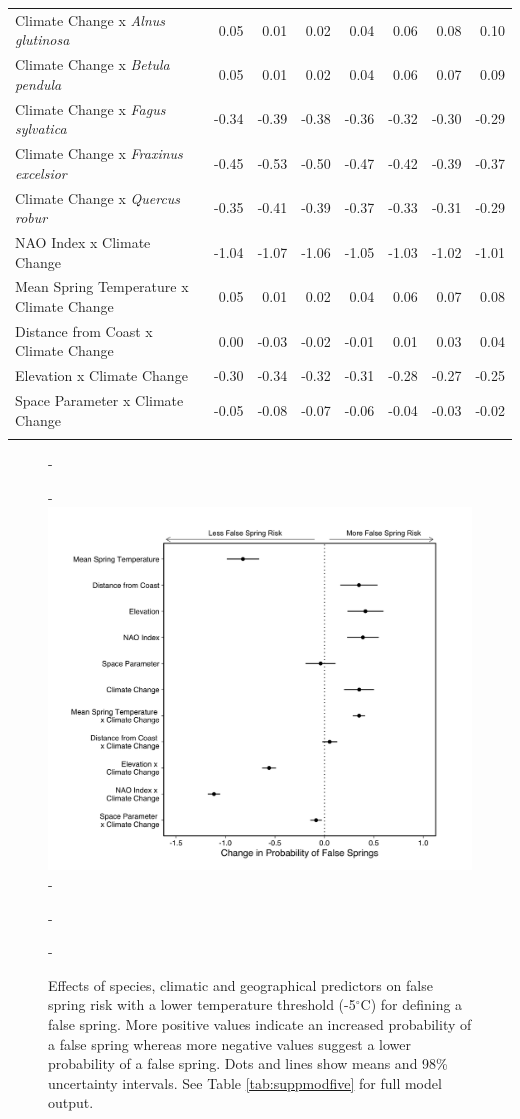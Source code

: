 \documentclass{article}\usepackage[]{graphicx}\usepackage[]{color}
\begin{document}
\begin{longtable}{lrrrrrrr}
  Climate Change
x\textit{ Alnus glutinosa} & 0.05 & 0.01 & 0.02 & 0.04 & 0.06 & 0.08 & 0.10 \\ 
  Climate Change
x\textit{ Betula pendula} & 0.05 & 0.01 & 0.02 & 0.04 & 0.06 & 0.07 & 0.09 \\ 
  Climate Change
x\textit{ Fagus sylvatica} & -0.34 & -0.39 & -0.38 & -0.36 & -0.32 & -0.30 & -0.29 \\ 
  Climate Change
x\textit{ Fraxinus excelsior} & -0.45 & -0.53 & -0.50 & -0.47 & -0.42 & -0.39 & -0.37 \\ 
  Climate Change
x\textit{ Quercus robur} & -0.35 & -0.41 & -0.39 & -0.37 & -0.33 & -0.31 & -0.29 \\ 
  NAO Index x Climate Change & -1.04 & -1.07 & -1.06 & -1.05 & -1.03 & -1.02 & -1.01 \\ 
  Mean Spring 
Temperature x Climate Change & 0.05 & 0.01 & 0.02 & 0.04 & 0.06 & 0.07 & 0.08 \\ 
  Distance from 
Coast x Climate Change & 0.00 & -0.03 & -0.02 & -0.01 & 0.01 & 0.03 & 0.04 \\ 
  Elevation x Climate Change & -0.30 & -0.34 & -0.32 & -0.31 & -0.28 & -0.27 & -0.25 \\ 
  Space Parameter x Climate Change & -0.05 & -0.08 & -0.07 & -0.06 & -0.04 & -0.03 & -0.02 \\ 
   \hline
\hline
\label{tab:suppmoddvr}
\end{longtable}

  
  {\begin{figure} [H]
  -\begin{center}
  -\includegraphics[width=12cm]{..//analyses/figures/model_output_98_fivelong.png}
  -\caption{Effects of species, climatic and geographical predictors on false spring risk with a lower temperature threshold (-5$^{\circ}$C) for defining a false spring. More positive values indicate an increased probability of a false spring whereas more negative values suggest a lower probability of a false spring. Dots and lines show means and 98\% uncertainty intervals. See Table \ref{tab:suppmodfive} for full model output. }\label{fig:five}
  -\end{center}
  -\end{figure}}
  
\end{document}
